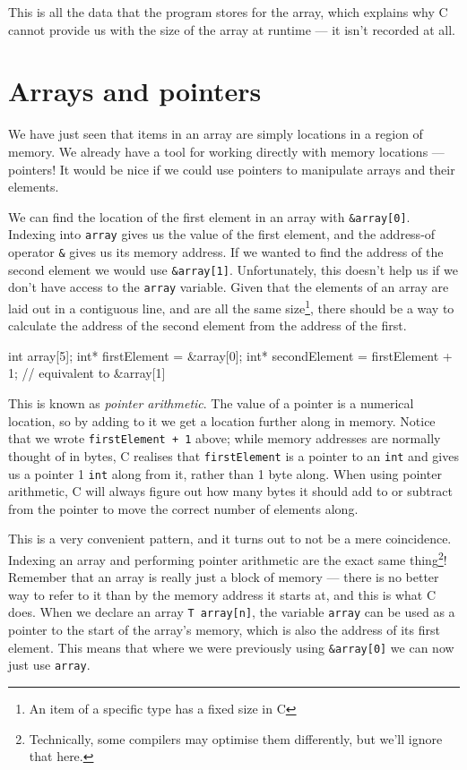 This is all the data that the program stores for the array, which explains why C cannot provide us with the size of the array at runtime --- it isn't recorded at all.

\section{Arrays and pointers}

We have just seen that items in an array are simply locations in a region of memory.
We already have a tool for working directly with memory locations --- pointers!
It would be nice if we could use pointers to manipulate arrays and their elements.

We can find the location of the first element in an array with \lstinline!&array[0]!.
Indexing into \lstinline!array! gives us the value of the first element, and the address-of operator \lstinline!&! gives us its memory address.
If we wanted to find the address of the second element we would use \lstinline!&array[1]!.
Unfortunately, this doesn't help us if we don't have access to the \lstinline!array! variable.
Given that the elements of an array are laid out in a contiguous line, and are all the same size\footnote{An item of a specific type has a fixed size in C}, there should be a way to calculate the address of the second element from the address of the first.

\begin{codeblock}
int array[5];
int* firstElement = &array[0];
int* secondElement = firstElement + 1; // equivalent to &array[1]
\end{codeblock}

This is known as \emph{pointer arithmetic}.
The value of a pointer is a numerical location, so by adding to it we get a location further along in memory.
Notice that we wrote \lstinline!firstElement + 1! above; while memory addresses are normally thought of in bytes, C realises that \lstinline{firstElement} is a pointer to an \lstinline!int! and gives us a pointer 1 \lstinline!int! along from it, rather than 1 byte along.
When using pointer arithmetic, C will always figure out how many bytes it should add to or subtract from the pointer to move the correct number of elements along.

This is a very convenient pattern, and it turns out to not be a mere coincidence.
Indexing an array and performing pointer arithmetic are the exact same thing\footnote{Technically, some compilers may optimise them differently, but we'll ignore that here.}!
Remember that an array is really just a block of memory --- there is no better way to refer to it than by the memory address it starts at, and this is what C does.
When we declare an array \lstinline!T array[n]!, the variable \lstinline!array! can be used as a pointer to the start of the array's memory, which is also the address of its first element.
This means that where we were previously using \lstinline!&array[0]! we can now just use \lstinline!array!.

